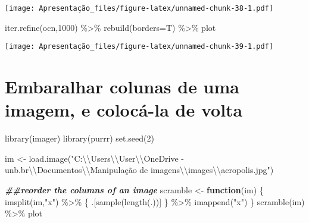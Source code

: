 \documentclass[
]{article}
\newenvironment{Shaded}{\begin{snugshade}}{\end{snugshade}}
\newcommand{\AttributeTok}[1]{\textcolor[rgb]{0.77,0.63,0.00}{#1}}
\newcommand{\ControlFlowTok}[1]{\textcolor[rgb]{0.13,0.29,0.53}{\textbf{#1}}}
\newcommand{\DecValTok}[1]{\textcolor[rgb]{0.00,0.00,0.81}{#1}}
\newcommand{\DocumentationTok}[1]{\textcolor[rgb]{0.56,0.35,0.01}{\textbf{\textit{#1}}}}
\newcommand{\FunctionTok}[1]{\textcolor[rgb]{0.00,0.00,0.00}{#1}}
\newcommand{\NormalTok}[1]{#1}
\newcommand{\OtherTok}[1]{\textcolor[rgb]{0.56,0.35,0.01}{#1}}
\newcommand{\SpecialCharTok}[1]{\textcolor[rgb]{0.00,0.00,0.00}{#1}}
\newcommand{\StringTok}[1]{\textcolor[rgb]{0.31,0.60,0.02}{#1}}
\begin{document}
\texttt{[image: Apresentação\_files/figure-latex/unnamed-chunk-38-1.pdf]}

\begin{Shaded}
\begin{Highlighting}[]
\FunctionTok{iter.refine}\NormalTok{(ocn,}\DecValTok{1000}\NormalTok{) }\SpecialCharTok{\%\textgreater{}\%} \FunctionTok{rebuild}\NormalTok{(}\AttributeTok{borders=}\NormalTok{T) }\SpecialCharTok{\%\textgreater{}\%}\NormalTok{ plot}
\end{Highlighting}
\end{Shaded}

\texttt{[image: Apresentação\_files/figure-latex/unnamed-chunk-39-1.pdf]}

\hypertarget{embaralhar-colunas-de-uma-imagem-e-colocuxe1-la-de-volta}{%
\section{Embaralhar colunas de uma imagem, e colocá-la de
volta}\label{embaralhar-colunas-de-uma-imagem-e-colocuxe1-la-de-volta}}

\begin{Shaded}
\begin{Highlighting}[]
\FunctionTok{library}\NormalTok{(imager)}
\FunctionTok{library}\NormalTok{(purrr)}
\FunctionTok{set.seed}\NormalTok{(}\DecValTok{2}\NormalTok{)}

\NormalTok{im }\OtherTok{\textless{}{-}} \FunctionTok{load.image}\NormalTok{(}\StringTok{"C:}\SpecialCharTok{\textbackslash{}\textbackslash{}}\StringTok{Users}\SpecialCharTok{\textbackslash{}\textbackslash{}}\StringTok{User}\SpecialCharTok{\textbackslash{}\textbackslash{}}\StringTok{OneDrive {-} unb.br}\SpecialCharTok{\textbackslash{}\textbackslash{}}\StringTok{Documentos}\SpecialCharTok{\textbackslash{}\textbackslash{}}\StringTok{Manipulação de imagens}\SpecialCharTok{\textbackslash{}\textbackslash{}}\StringTok{images}\SpecialCharTok{\textbackslash{}\textbackslash{}}\StringTok{acropolis.jpg"}\NormalTok{)}

\DocumentationTok{\#\#reorder the columns of an image}
\NormalTok{scramble }\OtherTok{\textless{}{-}} \ControlFlowTok{function}\NormalTok{(im)}
\NormalTok{\{}
    \FunctionTok{imsplit}\NormalTok{(im,}\StringTok{"x"}\NormalTok{) }\SpecialCharTok{\%\textgreater{}\%}\NormalTok{ \{ .[}\FunctionTok{sample}\NormalTok{(}\FunctionTok{length}\NormalTok{(.))] \} }\SpecialCharTok{\%\textgreater{}\%} \FunctionTok{imappend}\NormalTok{(}\StringTok{"x"}\NormalTok{) }
\NormalTok{\}}
\FunctionTok{scramble}\NormalTok{(im) }\SpecialCharTok{\%\textgreater{}\%}\NormalTok{ plot}
\end{Highlighting}
\end{Shaded}
\end{document}
